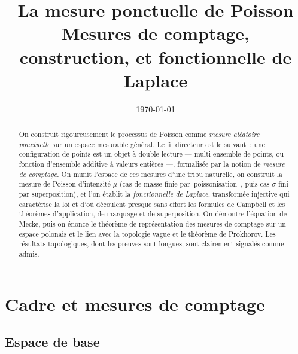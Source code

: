 \documentclass[11pt,a4paper]{article}
\title{\bf La mesure ponctuelle de Poisson\\[2pt]
\large Mesures de comptage, construction, et fonctionnelle de Laplace}
\author{}
\date{\today}
\providecommand{\og}{\guillemotleft\,}\providecommand{\fg}{\,\guillemotright}
\theoremstyle{plain}
\theoremstyle{definition}
\begin{document}
\maketitle

\begin{abstract}
\noindent On construit rigoureusement le processus de Poisson comme \emph{mesure aléatoire ponctuelle} sur un espace mesurable général. Le fil directeur est le suivant~: une configuration de points est un objet à double lecture --- multi-ensemble de points, ou fonction d'ensemble additive à valeurs entières ---, formalisée par la notion de \emph{mesure de comptage}. On munit l'espace de ces mesures d'une tribu naturelle, on construit la mesure de Poisson d'intensité $\mu$ (cas de masse finie par \og poissonisation \fg{}, puis cas $\sigma$-fini par superposition), et l'on établit la \emph{fonctionnelle de Laplace}, transformée injective qui caractérise la loi et d'où découlent presque sans effort les formules de Campbell et les théorèmes d'application, de marquage et de superposition. On démontre l'équation de Mecke, puis on énonce le théorème de représentation des mesures de comptage sur un espace polonais et le lien avec la topologie vague et le théorème de Prokhorov. Les résultats topologiques, dont les preuves sont longues, sont clairement signalés comme admis.
\end{abstract}

\tableofcontents

\bigskip

\section{Cadre et mesures de comptage}

\subsection{Espace de base}
\end{document}
